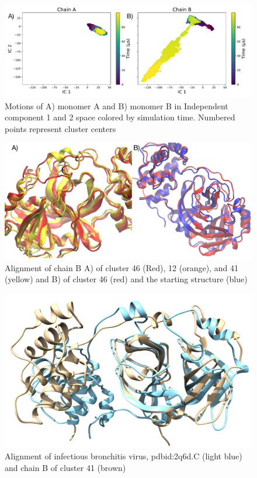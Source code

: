 \documentclass{biophys-new}
\begin{document}
\begin{figure}[h]
\centering
\graphicspath{ {./figures/} }
\includegraphics[width=0.6\linewidth]{fig_1_fdiscolortime_ic2_label.pdf}
\caption{Motions of A) monomer A and B) monomer B in Independent component 1 and 2 space colored by simulation time. Numbered points represent cluster centers}
\label{fig:view}
\end{figure}

\begin{figure}[h]
\graphicspath{ {./figures/} }
\centering
\includegraphics[width=0.6\linewidth]{fig2_IC1_align.pdf}
\caption{Alignment of chain B A) of cluster 46 (Red), 12 (orange), and 41 (yellow) and B) of cluster 46 (red) and the starting structure (blue)}
\label{fig:view}
\end{figure}

\begin{figure}[h]
\centering
\graphicspath{ {./images/} }
\includegraphics[width=0.6\linewidth]{blue-2Q6D-C-brown-cluster-41-better-align-2.png}
\caption{Alignment of infectious bronchitis virus, pdbid:2q6d.C (light blue) and chain B of cluster 41 (brown)}
\label{fig:view}
\end{figure}
\end{document}
